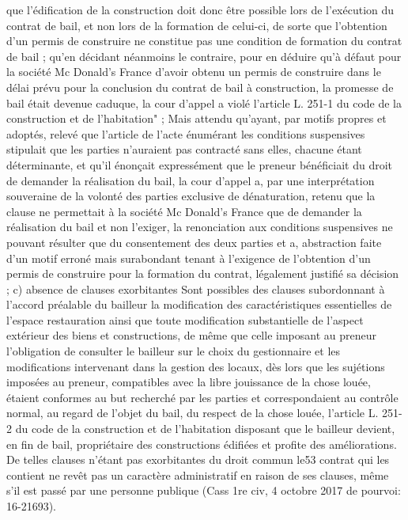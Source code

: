 \documentclass[11pt,a4paper]{report}
\begin{document}
	que l'édification de la construction doit donc être possible lors de l'exécution du contrat de bail, et non lors de la
	formation de celui-ci, de sorte que l'obtention d'un permis de construire ne constitue pas une condition de
	formation du contrat de bail ; qu'en décidant néanmoins le contraire, pour en déduire qu'à défaut pour la société
	Mc Donald's France d'avoir obtenu un permis de construire dans le délai prévu pour la conclusion du contrat de
	bail à construction, la promesse de bail était devenue caduque, la cour d'appel a violé l'article L. 251-1 du code
	de la construction et de l'habitation" ;
	Mais attendu qu'ayant, par motifs propres et adoptés, relevé que l'article de l'acte énumérant les conditions
	suspensives stipulait que les parties n'auraient pas contracté sans elles, chacune étant déterminante, et qu'il
	énonçait expressément que le preneur bénéficiait du droit de demander la réalisation du bail, la cour d'appel a,
	par une interprétation souveraine de la volonté des parties exclusive de dénaturation, retenu que la clause ne
	permettait à la société Mc Donald's France que de demander la réalisation du bail et non l'exiger, la
	renonciation aux conditions suspensives ne pouvant résulter que du consentement des deux parties et a,
	abstraction faite d'un motif erroné mais surabondant tenant à l'exigence de l'obtention d'un permis de construire
	pour la formation du contrat, légalement justifié sa décision ;
	c)
	absence de clauses exorbitantes
	Sont possibles des clauses subordonnant à l'accord préalable du bailleur la modification des caractéristiques
	essentielles de l'espace restauration ainsi que toute modification substantielle de l'aspect extérieur des biens et
	constructions, de même que celle imposant au preneur l'obligation de consulter le bailleur sur le choix du
	gestionnaire et les modifications intervenant dans la gestion des locaux, dès lors que les sujétions imposées au
	preneur, compatibles avec la libre jouissance de la chose louée, étaient conformes au but recherché par les parties
	et correspondaient au contrôle normal, au regard de l'objet du bail, du respect de la chose louée, l'article L. 251-2
	du code de la construction et de l'habitation disposant que le bailleur devient, en fin de bail, propriétaire des
	constructions édifiées et profite des améliorations. De telles clauses n’étant pas exorbitantes du droit commun le53
	contrat qui les contient ne revêt pas un caractère administratif en raison de ses clauses, même s’il est passé par
	une personne publique (Cass 1re civ, 4 octobre 2017 \No  de pourvoi: 16-21693).
\end{document}
